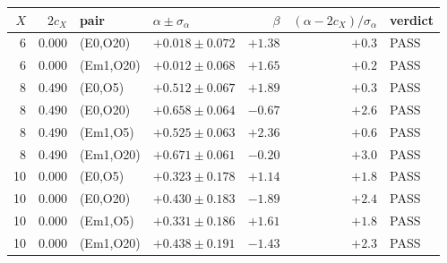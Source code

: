 \begin{tabular}{rrllrrl}
\toprule
$X$ & $2c_X$ & pair & $\alpha\pm\sigma_\alpha$ & $\beta$ & $(\alpha-2c_X)/\sigma_\alpha$ & verdict \\
\midrule
6 & $0.000$ & (E0,O20) & $+0.018\pm0.072$ & $+1.38$ & $+0.3$ & PASS \\
6 & $0.000$ & (Em1,O20) & $+0.012\pm0.068$ & $+1.65$ & $+0.2$ & PASS \\
8 & $0.490$ & (E0,O5) & $+0.512\pm0.067$ & $+1.89$ & $+0.3$ & PASS \\
8 & $0.490$ & (E0,O20) & $+0.658\pm0.064$ & $-0.67$ & $+2.6$ & PASS \\
8 & $0.490$ & (Em1,O5) & $+0.525\pm0.063$ & $+2.36$ & $+0.6$ & PASS \\
8 & $0.490$ & (Em1,O20) & $+0.671\pm0.061$ & $-0.20$ & $+3.0$ & PASS \\
10 & $0.000$ & (E0,O5) & $+0.323\pm0.178$ & $+1.14$ & $+1.8$ & PASS \\
10 & $0.000$ & (E0,O20) & $+0.430\pm0.183$ & $-1.89$ & $+2.4$ & PASS \\
10 & $0.000$ & (Em1,O5) & $+0.331\pm0.186$ & $+1.61$ & $+1.8$ & PASS \\
10 & $0.000$ & (Em1,O20) & $+0.438\pm0.191$ & $-1.43$ & $+2.3$ & PASS \\
\bottomrule
\end{tabular}
